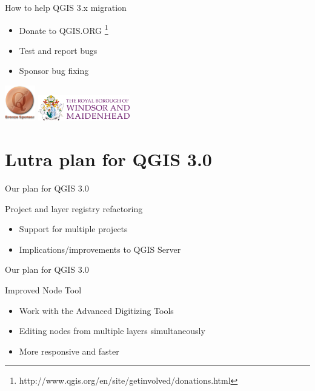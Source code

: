 \begin{frame}{How to help QGIS 3.x migration}
\begin{block}{}
	\begin{itemize}
		\item Donate to QGIS.ORG \footnote{http://www.qgis.org/en/site/getinvolved/donations.html}
		\item Test and report bugs
		\item Sponsor bug fixing
	\end{itemize}
\end{block}
\includegraphics[width=0.1\textwidth]{bronze.png} \includegraphics[width=0.3\textwidth]{windsor.png} 
\end{frame}


\section{Lutra plan for QGIS 3.0}
\begin{frame}{Our plan for QGIS 3.0}
	\begin{block}{Project and layer registry refactoring}
		\begin{itemize}
			\item Support for multiple projects
			\item Implications/improvements to QGIS Server
		\end{itemize}
	\end{block}
\end{frame}

\begin{frame}{Our plan for QGIS 3.0}
	\begin{block}{Improved Node Tool}
		\begin{itemize}
			\item Work with the Advanced Digitizing Tools 
			\item Editing nodes from multiple layers simultaneously
			\item More responsive and faster
		\end{itemize}
	\end{block}
\end{frame}

